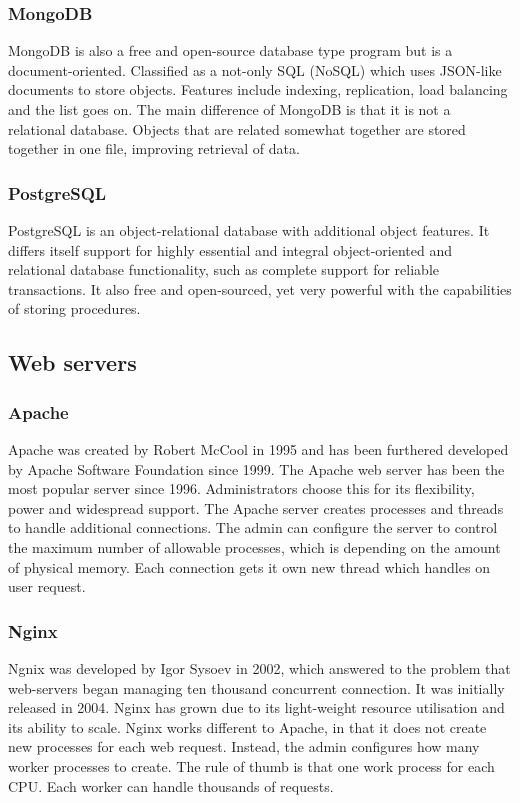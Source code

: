 \subsubsection{MongoDB}
MongoDB \cite{mongoDB} is also a free and open-source database type program but is a document-oriented. Classified as a not-only SQL (NoSQL) which uses JSON-like documents to store objects. Features include indexing, replication, load balancing and the list goes on. The main difference of MongoDB is that it is not a relational database. Objects that are related somewhat together are stored together in one file, improving retrieval of data.

\subsubsection{PostgreSQL}
PostgreSQL \cite{postgreSQL} is an object-relational database with additional object features. It differs itself support for highly essential and integral object-oriented and relational database functionality, such as complete support for reliable transactions. It also free and open-sourced, yet very powerful with the capabilities of storing procedures.

\subsection{Web servers}

\subsubsection{Apache}
Apache \cite{apache} was created by Robert McCool in 1995 and has been furthered developed by Apache Software Foundation since 1999. The Apache web server has been the most popular server since 1996. Administrators choose this for its flexibility, power and widespread support. The Apache server creates processes and threads to handle additional connections. The admin can configure the server to control the maximum number of allowable processes, which is depending on the amount of physical memory. Each connection gets it own new thread which handles on user request.

\subsubsection{Nginx}
Ngnix \cite{nginx} was developed by Igor Sysoev in 2002, which answered to the problem that web-servers began managing ten thousand concurrent connection. It was initially released in 2004. Nginx has grown due to its light-weight resource utilisation and its ability to scale. Nginx works different to Apache, in that it does not create new processes for each web request. Instead, the admin configures how many worker processes to create. The rule of thumb is that one work process for each CPU. Each worker can handle thousands of requests.

